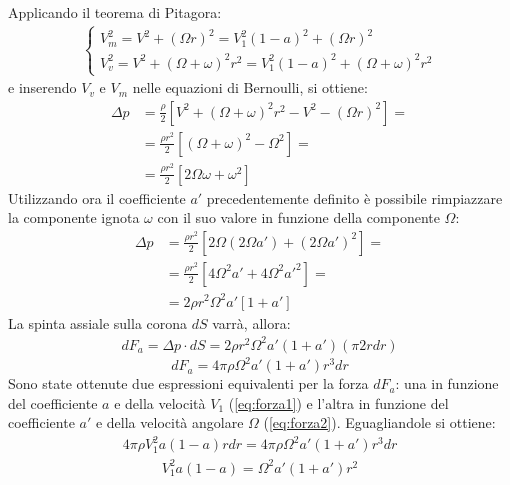 Applicando il teorema di Pitagora:
\begin{align*}
\begin{cases}
V_m^2 = V^2 + \left( \Omega r \right)^2 = V_1^2 \left(1-a \right)^2 + \left( \Omega r \right)^2\\
V_v^2 = V^2 + \left( \Omega + \omega \right)^2 r^2= V_1^2 \left(1-a \right)^2 + \left( \Omega + \omega \right)^2 r^2
\end{cases}
\end{align*}
e inserendo $V_v$ e $V_m$ nelle equazioni di Bernoulli, si ottiene:
\begin{align*}
\Delta p & =\frac{\rho}{2} \left[ V^2 + \left( \Omega + \omega \right)^2 r^2 - V^2 - \left( \Omega r \right)^2 \right]=\\
& =\frac{\rho r^2}{2} \left[ \left( \Omega + \omega \right)^2 - \Omega^2 \right]= \\
& =\frac{\rho r^2}{2} \left[ 2 \Omega \omega + \omega^2 \right]
\end{align*}
Utilizzando ora il coefficiente $a'$ precedentemente definito è possibile rimpiazzare la componente ignota $\omega$ con il suo valore in funzione della componente $\Omega$:
\begin{align*}
\Delta p &= \frac{\rho r^2}{2} \left[ 2 \Omega \left( 2 \Omega a'\right) + \left( 2 \Omega a' \right)^2 \right]=\\
&= \frac{\rho r^2}{2} \left[ 4 \Omega^2 a' + 4 \Omega^2 a'^2 \right] = \\
&= 2 \rho r^2 \Omega^2 a' \left[ 1+a' \right]
\end{align*}
La spinta assiale sulla corona $dS$ varrà, allora:
\begin{align*}
dF_a = \Delta p \cdot dS = 2 \rho r^2 \Omega^2 a' \left(1 + a' \right) \left( \pi 2 r dr \right)
\end{align*}
\begin{equation}\label{eq:forza2}
dF_a = 4 \pi \rho \Omega^2 a' \left( 1+ a' \right) r^3 dr
\end{equation}
Sono state ottenute due espressioni equivalenti per la forza $dF_a$: una in funzione del coefficiente $a$ e della velocità $V_1$ (\ref{eq:forza1}) e l'altra in funzione del coefficiente $a'$ e della velocità angolare $\Omega$ (\ref{eq:forza2}). Eguagliandole si ottiene:
\begin{align*}
4 \pi \rho V_1^2 a \left( 1 - a \right) r dr = 4 \pi \rho \Omega^2 a' \left( 1 + a' \right) r^3 dr
\end{align*}
\begin{align*}
V_1^2 a \left( 1 - a \right) = \Omega^2 a' \left( 1 + a' \right) r^2
\end{align*}
